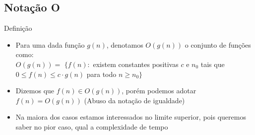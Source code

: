 \documentclass{beamer}
\begin{document}
\subsection{Notação O}
\begin{frame}
    \begin{block}{Definição}
     \begin{itemize}
      \item Para uma dada função $g(n)$, denotamos $O(g(n))$ o conjunto de funções como:\\
      $O(g(n)) = $ $\{ f(n):$ existem constantes positivas $c$ e $n_0$ tais que $0\leq f(n) \leq c\cdot g(n)$ para todo $n \geq n_0 \}$
      \item Dizemos que $f(n) \in O(g(n))$, porém podemos adotar $f(n) = O(g(n))$ (Abuso da notação de igualdade)
      \item Na maiora dos casos estamos interessados no limite superior, pois queremos saber no pior caso, qual a complexidade de tempo
     \end{itemize}

    \end{block}

 \end{frame}
 
\end{document}
